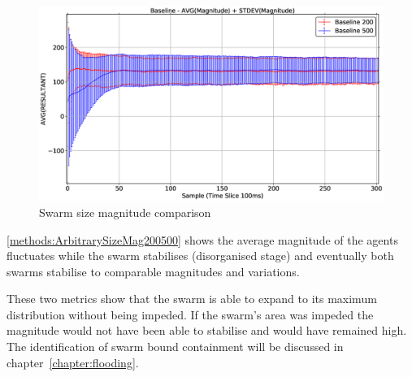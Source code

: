 \begin{figure}[H]
\begin{center}
\includegraphics[width=13cm]{CHAPTER-5/figures/ArbitrarySize200500MAG}
\end{center}
\caption{Swarm size magnitude comparison\label{methods:ArbitrarySizeMag200500}}
\end{figure}

\autoref{methods:ArbitrarySizeMag200500} shows the average magnitude of the agents fluctuates while the swarm stabilises (disorganised stage) and eventually both swarms stabilise to comparable magnitudes and variations.

These two metrics show that the swarm is able to expand to its maximum distribution without being impeded. If the swarm's area was impeded the magnitude would not have been able to stabilise and would have remained high. The identification of swarm bound containment will be discussed in chapter~\ref{chapter:flooding}.



